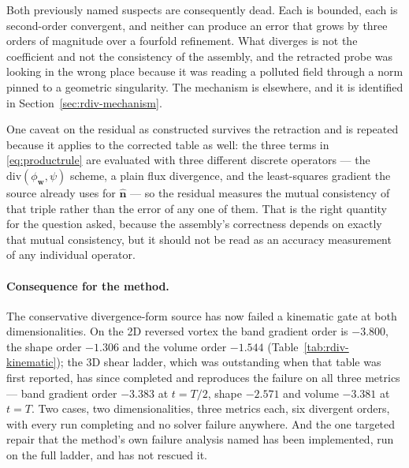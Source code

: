 \documentclass[preprint,3p,11pt]{elsarticle}
\newcommand{\psilev}{\psi}
\newcommand{\nhat}{\hat{\mathbf{n}}}
\begin{document}
Both previously named suspects are consequently dead. Each is bounded, each is
second-order convergent, and neither can produce an error that grows by three
orders of magnitude over a fourfold refinement. What diverges is not the
coefficient and not the consistency of the assembly, and the retracted probe was
looking in the wrong place because it was reading a polluted field through a norm
pinned to a geometric singularity. The mechanism is elsewhere, and it is
identified in Section~\ref{sec:rdiv-mechanism}.

One caveat on the residual as constructed survives the retraction and is repeated
because it applies to the corrected table as well: the three terms in
\eqref{eq:productrule} are evaluated with three different discrete operators ---
the $\mathrm{div}(\phi_{\mathbf{w}},\psilev)$ scheme, a plain flux divergence, and
the least-squares gradient the source already uses for $\nhat$ --- so the residual
measures the mutual consistency of that triple rather than the error of any one of
them. That is the right quantity for the question asked, because the assembly's
correctness depends on exactly that mutual consistency, but it should not be read
as an accuracy measurement of any individual operator.

\paragraph{Consequence for the method.} The conservative divergence-form source
has now failed a kinematic gate at both dimensionalities. On the 2D reversed
vortex the band gradient order is $-3.800$, the shape order $-1.306$ and the
volume order $-1.544$ (Table~\ref{tab:rdiv-kinematic}); the 3D shear ladder, which
was outstanding when that table was first reported, has since completed and
reproduces the failure on all three metrics --- band gradient order $-3.383$ at
$t=T/2$, shape $-2.571$ and volume $-3.381$ at $t=T$. Two cases, two
dimensionalities, three metrics each, six divergent orders, with every run
completing and no solver failure anywhere. And the one targeted repair that the
method's own failure analysis named has been implemented, run on the full ladder,
and has not rescued it.
\end{document}
